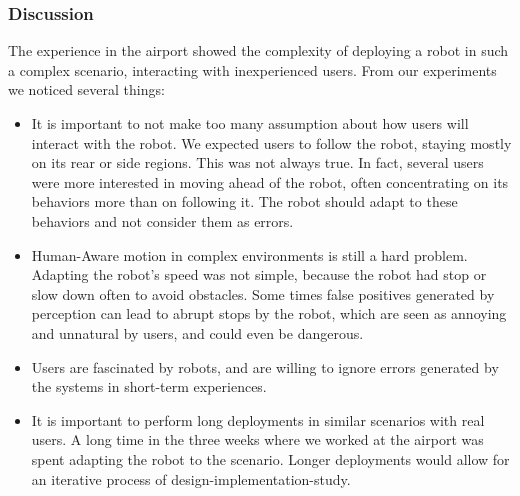 \subsubsection{Discussion}
The experience in the airport showed the complexity of deploying a robot in such a complex scenario, interacting with inexperienced users. From our experiments we noticed several things:
\begin{itemize}
\item It is important to not make too many assumption about how users will interact with the robot. We expected users to follow the robot, staying mostly on its rear or side regions. This was not always true. In fact, several users were more interested in moving ahead of the robot, often concentrating on its behaviors more than on following it. The robot should adapt to these behaviors and not consider them as errors.
\item Human-Aware motion in complex environments is still a hard problem. Adapting the robot's speed was not simple, because the robot had stop or slow down often to avoid obstacles. Some times false positives generated by perception can lead to abrupt stops by the robot, which are seen as annoying and unnatural by users, and could even be dangerous.
\item Users are fascinated by robots, and are willing to ignore errors generated by the systems in short-term experiences.
\item It is important to perform long deployments in similar scenarios with real users. A long time in the three weeks where we worked at the airport was spent adapting the robot to the scenario. Longer deployments would allow for an iterative process of design-implementation-study.
\end{itemize}
